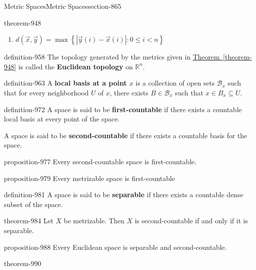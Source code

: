 \documentclass[oneside,10pt,]{article}
\newcommand{\terminology}[1]{\textbf{#1}}
\newcommand{\mb}{\mathbb}
\newcommand{\mc}{\mathcal}
\newcommand{\setBuilder}[2]{\left\{#1:#2\right\}}
\newcommand{\lt}{<}
\begin{document}
\begin{sectionptx}{Metric Spaces}{}{Metric Spaces}{}{}{section-865}
\begin{theorem}{}{}{theorem-948}
\begin{enumerate}
\item\hypertarget{li-956}{}\(d(\vec x,\vec y)=\max\setBuilder{|\vec y(i)-\vec x(i)|}{0\leq i\lt n}\)%
\end{enumerate}
\end{theorem}
\begin{definition}{}{definition-958}%
\hypertarget{p-959}{}%
The topology generated by the metrics given in \hyperref[theorem-948]{Theorem~\ref{theorem-948}} is called the \terminology{Euclidean topology} on \(\mb R^n\).%
\end{definition}
\begin{definition}{}{definition-963}%
\hypertarget{p-964}{}%
A \terminology{local basis at a point \(x\)} is a collection of open sets \(\mc B_x\) such that for every neighborhood \(U\) of \(x\), there exists \(B\in\mc B_x\) such that \(x\in B_x\subseteq U\).%
\end{definition}
\begin{definition}{}{definition-972}%
\hypertarget{p-973}{}%
A space is said to be \terminology{first-countable} if there exists a countable local basis at every point of the space.%
\par
\hypertarget{p-975}{}%
A space is said to be \terminology{second-countable} if there exists  a countable basis for the space.%
\end{definition}
\begin{proposition}{}{}{proposition-977}%
\hypertarget{p-978}{}%
Every second-countable space is first-countable.%
\end{proposition}
\begin{proposition}{}{}{proposition-979}%
\hypertarget{p-980}{}%
Every metrizable space is first-countable%
\end{proposition}
\begin{definition}{}{definition-981}%
\hypertarget{p-982}{}%
A space is said to be \terminology{separable} if there exists a countable dense subset of the space.%
\end{definition}
\begin{theorem}{}{}{theorem-984}%
\hypertarget{p-985}{}%
Let \(X\) be metrizable. Then \(X\) is second-countable if and only if it is separable.%
\end{theorem}
\begin{proposition}{}{}{proposition-988}%
\hypertarget{p-989}{}%
Every Euclidean space is separable and second-countable.%
\end{proposition}
\begin{theorem}{}{}{theorem-990}%
\hypertarget{p-991}{}%

\end{theorem}
\end{sectionptx}
\end{document}
